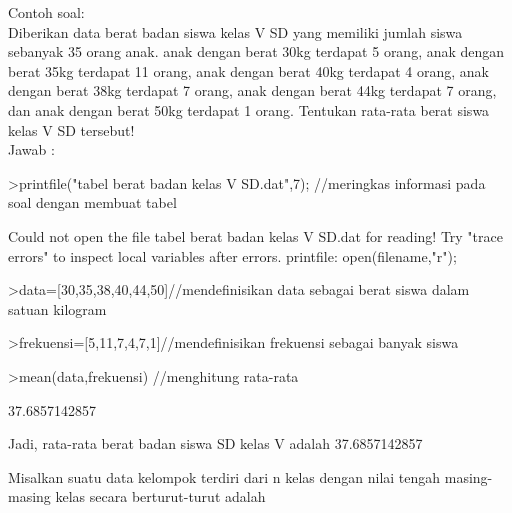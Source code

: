 \documentclass[a4paper,10pt]{article}
\begin{document}
\begin{eulernotebook}
\begin{eulercomment}
\begin{eulercomment}
\begin{eulercomment}
\begin{eulercomment}
\begin{eulercomment}
\begin{eulercomment}
\begin{eulercomment}
\begin{eulercomment}
\begin{eulercomment}
\begin{eulercomment}
\begin{eulercomment}
Contoh soal:\\
Diberikan data berat badan siswa kelas V SD yang memiliki jumlah siswa
sebanyak 35 orang anak. anak dengan berat 30kg terdapat 5 orang, anak
dengan berat 35kg terdapat 11 orang, anak dengan berat 40kg terdapat 4
orang, anak dengan berat 38kg terdapat 7 orang, anak dengan berat 44kg
terdapat 7 orang, dan anak dengan berat 50kg terdapat 1 orang.
Tentukan rata-rata berat siswa kelas V SD tersebut!\\
Jawab :
\end{eulercomment}
\begin{eulerprompt}
>printfile("tabel berat badan kelas V SD.dat",7); //meringkas informasi pada soal dengan membuat tabel
\end{eulerprompt}
\begin{euleroutput}
  Could not open the file
  tabel berat badan kelas V SD.dat
  for reading!
  Try "trace errors" to inspect local variables after errors.
  printfile:
      open(filename,"r");
\end{euleroutput}
\begin{eulerprompt}
>data=[30,35,38,40,44,50]//mendefinisikan data sebagai berat siswa dalam satuan kilogram
\end{eulerprompt}
\begin{euleroutput}
  [30,  35,  38,  40,  44,  50]
\end{euleroutput}
\begin{eulerprompt}
>frekuensi=[5,11,7,4,7,1]//mendefinisikan frekuensi sebagai banyak siswa
\end{eulerprompt}
\begin{euleroutput}
  [5,  11,  7,  4,  7,  1]
\end{euleroutput}
\begin{eulerprompt}
>mean(data,frekuensi) //menghitung rata-rata
\end{eulerprompt}
\begin{euleroutput}
  37.6857142857
\end{euleroutput}
\begin{eulercomment}
Jadi, rata-rata berat badan siswa SD kelas V adalah 37.6857142857
\end{eulercomment}
\begin{eulercomment}
Misalkan suatu data kelompok terdiri dari n kelas dengan nilai tengah
masing-masing kelas secara berturut-turut adalah\\
\end{eulercomment}
\begin{eulerformula}

\end{eulerformula}
\end{eulercomment}
\end{eulercomment}
\end{eulercomment}
\end{eulercomment}
\end{eulercomment}
\end{eulercomment}
\end{eulercomment}
\end{eulercomment}
\end{eulercomment}
\end{eulercomment}
\end{eulernotebook}
\end{document}

